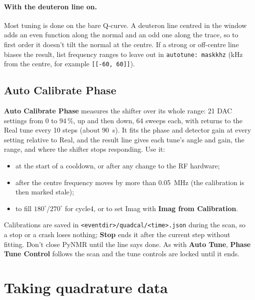 \documentclass[11pt]{article}
\newcommand{\code}[1]{\texttt{\begingroup\def\_{\textunderscore\allowbreak}#1\endgroup}}
\newcommand{\btn}[1]{\textsf{\textbf{#1}}}   %
\begin{document}
\paragraph{With the deuteron line on.} Most tuning is done on the bare Q-curve. A deuteron line centred in the
window adds an even function along the normal and an odd one along the trace, so to first order it doesn't
tilt the normal at the centre. If a strong or off-centre line biases the result, list frequency ranges to
leave out in \code{autotune: mask\_khz} (kHz from the centre, for example \code{[[-60, 60]]}).

\subsection{Auto Calibrate Phase}
\label{sec:cal}
\btn{Auto Calibrate Phase} measures the shifter over its whole range: 21 DAC settings from 0 to 94\,\%, up and
then down, 64 sweeps each, with returns to the Real tune every 10 steps (about 90~s). It fits the phase and
detector gain at every setting relative to Real, and the result line gives each tune's angle and gain, the
range, and where the shifter stops responding. Use it:
\begin{itemize}
\item at the start of a cooldown, or after any change to the RF hardware;
\item after the centre frequency moves by more than 0.05~MHz (the calibration is then marked stale);
\item to fill $180^\circ$/$270^\circ$ for cycle4, or to set Imag with \btn{Imag from Calibration}.
\end{itemize}
Calibrations are saved in \code{<event\_dir>/quad\_cal/<time>.json} during the scan, so a stop or a crash loses
nothing; \btn{Stop} ends it after the current step without fitting. Don't close PyNMR until the line says done.
As with \btn{Auto Tune}, \btn{Phase Tune Control} follows the scan and the tune controls are locked until it ends.

\section{Taking quadrature data}
\label{sec:run}
\end{document}
